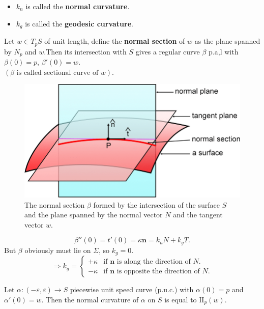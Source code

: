 \documentclass{article}
\begin{document}
\begin{definition}
\begin{itemize}
    \item $k_n$ is called the \textbf{normal curvature}.
    \item $k_g$ is called the \textbf{geodesic curvature}.
\end{itemize}
\end{definition}

\begin{example}
Let $w \in T_p S$ of unit length, define the \textbf{normal section} of $w$ as the plane spanned by $N_p$ and $w$.Then its intersection with $S$ gives a regular curve $\beta$ p.a,l with $\beta(0) = p$, $\beta'(0) = w$.\\
$(\beta \text{ is called sectional curve of } w)$.
\end{example}

\begin{figure}[h]
    \centering
    \includegraphics[width=0.5\linewidth]{Normal-section.png} %
    \caption{The normal section $\beta$ formed by the intersection of the surface $S$ and the plane spanned by the normal vector $N$ and the tangent vector $w$.}
    \label{fig:normal_section}
\end{figure}


\begin{remark}
$$ \beta''(0) = t'(0) = \kappa \mathbf{n} = k_n N + k_g T. $$
But $\beta$ obviously must lie on $\Sigma$, so $k_g = 0$.
$$ \Rightarrow k_g = \begin{cases} +\kappa & \text{if } \mathbf{n} \text{ is along the direction of } N. \\ -\kappa & \text{if } \mathbf{n} \text{ is opposite the direction of } N. \end{cases} $$
\end{remark}

\begin{proposition}
Let $\alpha: (-\varepsilon, \varepsilon) \to S$ piecewise unit speed curve (p.u.c.) with $\alpha(0) = p$ and $\alpha'(0) = w$.
Then the normal curvature of $\alpha$ on $S$ is equal to $\mathrm{II}_p(w)$.
\end{proposition}
\end{document}
